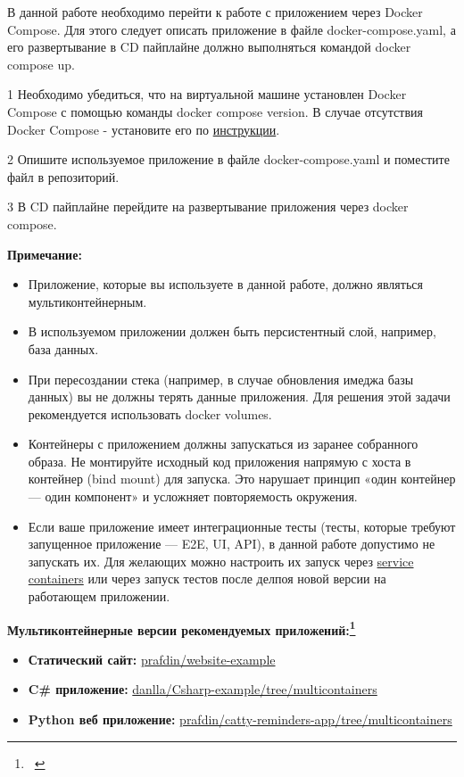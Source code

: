 \documentclass[12pt,a4paper]{article}
\begin{document}
В данной работе необходимо перейти к работе с приложением через Docker Compose. Для этого следует описать приложение
в файле docker-compose.yaml, а его развертывание в CD пайплайне должно выполняться командой docker compose up.

\begin{task}{1}
    Необходимо убедиться, что на виртуальной машине установлен Docker Compose с помощью команды docker compose version.
    В случае отсутствия Docker Compose - установите его по \href{https://docs.docker.com/compose/install/linux/}{инструкции}.
\end{task}

\begin{task}{2}
    Опишите используемое приложение в файле docker-compose.yaml и поместите файл в репозиторий.
\end{task}

\begin{task}{3}
    В CD пайплайне перейдите на развертывание приложения через docker compose.
\end{task}

\textbf{Примечание:}
\begin{itemize}
    \item Приложение, которые вы используете в данной работе, должно являться мультиконтейнерным.
    \item В используемом приложении должен быть персистентный слой, например, база данных.
    \item При пересоздании стека (например, в случае обновления имеджа базы данных) вы не должны терять данные приложения. Для решения этой задачи рекомендуется использовать docker volumes.
    \item Контейнеры с приложением должны запускаться из заранее собранного образа.
    Не монтируйте исходный код приложения напрямую с хоста в контейнер (bind mount) для запуска.
    Это нарушает принцип «один контейнер — один компонент» и усложняет повторяемость окружения.
    \item Если ваше приложение имеет интеграционные тесты (тесты, которые требуют запущенное приложение — E2E, UI, API), в данной работе допустимо не запускать их. Для желающих можно настроить их запуск через \href{https://docs.github.com/en/actions/tutorials/use-containerized-services/use-docker-service-containers}{service containers} или через запуск тестов после делпоя новой версии на работающем приложении.
\end{itemize}

\textbf{Мультиконтейнерные версии рекомендуемых приложений:\footnote{~}}
\begin{itemize}
    \item \textbf{Статический сайт:} \href{https://github.com/prafdin/website-example.git}{prafdin/website-example}
    \item \textbf{C\# приложение:} \href{https://github.com/danlla/Csharp-example/tree/multicontainers}{danlla/Csharp-example/tree/multicontainers}
    \item \textbf{Python веб приложение:} \href{https://github.com/prafdin/catty-reminders-app/tree/multicontainers}{prafdin/catty-reminders-app/tree/multicontainers}
\end{itemize}
\end{document}
